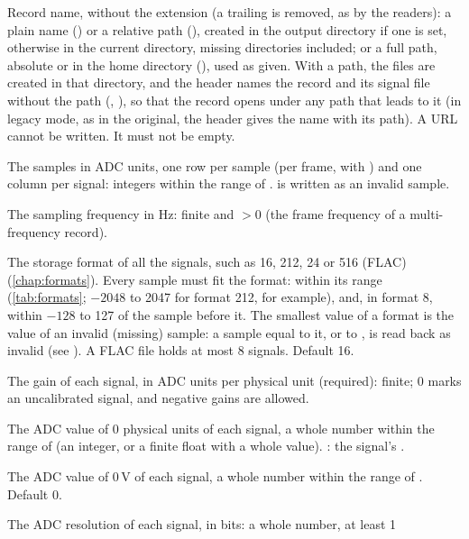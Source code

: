 \begin{params}
\item[record] Record name, without the  extension (a trailing 
  is removed, as by the readers): a plain name
  () or a relative path (), created in the output directory
  if one is set, otherwise in the current directory, missing directories included; or a
  full path, absolute or in the home directory (),
  used as given. With a path, the files are created in that directory, and the header
  names the record and its signal file without the path (, ),
  so that the record opens under any path that leads to it (in legacy mode, as in the
  original, the header gives the name with its path). A URL cannot be written. It must
  not be empty.
\item[samples] The samples in ADC units, one row per sample (per frame, with
  ) and one column per signal: integers within the range of
  .  is written as an invalid sample.
\item[fs] The sampling frequency in Hz: finite and $> 0$ (the frame frequency of a
  multi-frequency record).
\item[fmt] The storage format of all the signals, such as 16, 212, 24 or 516 (FLAC)
  (\cref{chap:formats}). Every sample must fit the format: within its range
  (\cref{tab:formats}; $-2048$ to 2047 for format 212, for example), and, in format 8,
  within $-128$ to 127 of the sample before it. The smallest value of a format is the
  value of an invalid (missing) sample: a sample equal to it, or to
  , is read back as invalid (see ).
  A FLAC file holds at most 8 signals. Default 16.
\item[gains] The gain of each signal, in ADC units per physical unit (required): finite;
  0 marks an uncalibrated signal, and negative gains are allowed.
\item[baselines] The ADC value of 0 physical units of each signal, a whole number
  within the range of  (an integer, or a finite float with a whole value).
  : the signal's .
\item[adczeros] The ADC value of 0\,V of each signal, a whole number within the range of
  . Default 0.
\item[adcres] The ADC resolution of each signal, in bits: a whole number, at least 1

\end{params}
